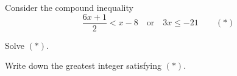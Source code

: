 
Consider the compound inequality
$$
\frac{6x+1}{2} < x-8 \quad \text{or} \quad 3x \leq -21 \qquad (*)
$$

\begin{enumx}[label=(\alph*)]
    \item Solve $(*)$.
    \item Write down the greatest integer satisfying $(*)$.
\end{enumx}



